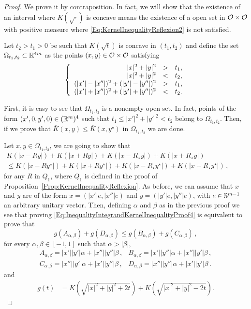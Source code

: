 \begin{proof}
We prove it by contraposition. In fact, we will show that the existence of an interval where
$K(\sqrt{\cdot})$ is concave means the existence of a open set in $\mathcal{O} \times \mathcal{O}$ with
positive measure where \eqref{Eq:KernelInequalityReflexion2} is not satisfied.

Let $t_2>t_1>0$ be such that $K(\sqrt{t})$ is concave in $(t_1,t_2)$ and define the set
$\Omega_{t_1,t_2}\subset \mathbb{R}^{4m}$ as the points $(x,y)\in \mathcal{O}\times \mathcal{O}$ satisfying
\begin{equation}
\label{eq:OmegaSetDefinition}
\left\{\begin{array}{rcll}
|x|^2+|y|^2&>&t_1,\\
|x|^2+|y|^2&<&t_2,\\
(|x'|-|x''|)^2+(|y'|-|y''|)^2&>&t_1,\\
(|x'|+|x''|)^2+(|y'|+|y''|)^2&<&t_2.
\end{array} \right.
\end{equation}

First, it is easy to see that $\Omega_{t_1,t_2}$ is a nonempty open set. In fact, points of the
form $(x',0,y',0)\in (\mathbb{R}^m)^4$ such that $t_1\leq |x'|^2+|y'|^2<t_2$ belong to $\Omega_{t_1,t_2}$.
Then, if we prove that $\overline{K}(x,y) \leq \overline{K}(x, y^\star)$ in $\Omega_{t_1,t_2}$ we
are done.

Let $x,y\in \Omega_{t_1,t_2}$, we are going to show that
\begin{equation}
\label{Eq:InequalityIntegrandKernelInequalityProof4}
\begin{split}
K(|x - R y|) + K(|x + R y|) + K(|x - R_\star y|) + K(|x + R_\star y|)
\quad \quad \quad \quad \quad \quad \quad \quad
\\
\leq
K(|x - R y^\star|) + K(|x + R y^\star|)+K(|x - R_\star y^\star|) + K(|x + R_\star y^\star|)\,,
\end{split}
\end{equation}
for any $R$ in $Q_1$, where $Q_1$ is defined in the proof of
Proposition~\ref{Prop:KernelInequalityReflexion}. As before, we can assume that $x$ and $y$ are of
the form $x = (|x'|e, |x''|e)$ and $y = (|y'|e, |y''|e)$, with $e \in \mathbb{S}^{m-1}$ an arbitrary
unitary vector. Then, defining $\alpha$ and $\beta$ as in the previous proof we see that proving
\eqref{Eq:InequalityIntegrandKernelInequalityProof4} is equivalent to prove that
\begin{equation}
\label{Eq:InequalityIntegrandKernelInequalityProof5}
g(A_{\alpha,\beta}) + g(D_{\alpha,\beta}) \leq g(B_{\alpha,\beta}) + g(C_{\alpha,\beta})\,,
\end{equation}
for every $\alpha, \beta \in [-1,1]$ such that $\alpha>|\beta|$,
$$
\begin{array}{cc}
A_{\alpha,\beta} = |x'||y'|  \alpha + |x''||y''|\beta \,, &
B_{\alpha,\beta} = |x'||y''| \alpha + |x''||y'| \beta \,, \\
C_{\alpha,\beta} = |x''||y'| \alpha + |x'||y''| \beta \,, &
D_{\alpha,\beta} = |x''||y''|\alpha + |x'||y'|  \beta \,.
\end{array}
$$
and
\begin{align*}
g(t) &= K\left( \sqrt{|x|^2+|y|^2+2t} \right) + K\left( \sqrt{|x|^2+|y|^2-2t} \right).
\end{align*}


\end{proof}
